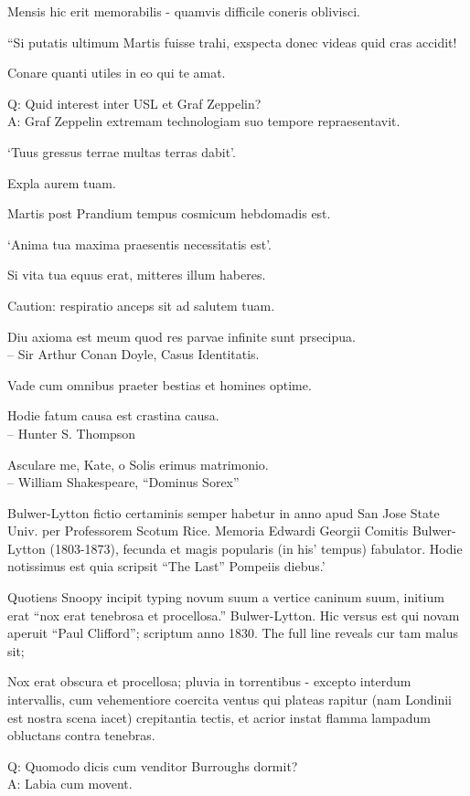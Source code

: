 \documentclass[titlepage,12pt]{memoir}
\begin{document}
Mensis hic erit memorabilis - quamvis difficile coneris oblivisci.

“Si putatis ultimum Martis fuisse trahi, exspecta donec videas quid cras accidit!

Conare quanti utiles in eo qui te amat.

Q: Quid interest inter USL et Graf Zeppelin?\\
A: Graf Zeppelin extremam technologiam suo tempore repraesentavit.

‘Tuus gressus terrae multas terras dabit’.

Expla aurem tuam.

Martis post Prandium tempus cosmicum hebdomadis est.

‘Anima tua maxima praesentis necessitatis est’.

Si vita tua equus erat, mitteres illum haberes.

Caution: respiratio anceps sit ad salutem tuam.

Diu axioma est meum quod res parvae infinite sunt prsecipua.
\\-- Sir Arthur Conan Doyle, Casus Identitatis.

Vade cum omnibus praeter bestias et homines optime.

Hodie fatum causa est crastina causa.
\\-- Hunter S. Thompson

Asculare me, Kate, o Solis erimus matrimonio.
\\-- William Shakespeare, “Dominus Sorex”

Bulwer-Lytton fictio certaminis semper habetur in anno apud San Jose State
Univ. per Professorem Scotum Rice. Memoria Edwardi Georgii
Comitis Bulwer-Lytton (1803-1873), fecunda et magis popularis (in his’
tempus) fabulator. Hodie notissimus est quia scripsit “The Last”
Pompeiis diebus.’

Quotiens Snoopy incipit typing novum suum a vertice caninum suum,
initium erat “nox erat tenebrosa et procellosa.”
Bulwer-Lytton. Hic versus est qui novam aperuit “Paul Clifford”;
scriptum anno 1830. The full line reveals cur tam malus sit;

Nox erat obscura et procellosa; pluvia in torrentibus - excepto
interdum intervallis, cum vehementiore coercita
ventus qui plateas rapitur (nam Londinii est nostra scena
iacet) crepitantia tectis, et acrior instat
flamma lampadum obluctans contra tenebras.

Q: Quomodo dicis cum venditor Burroughs dormit?\\
A: Labia cum movent.
\end{document}
